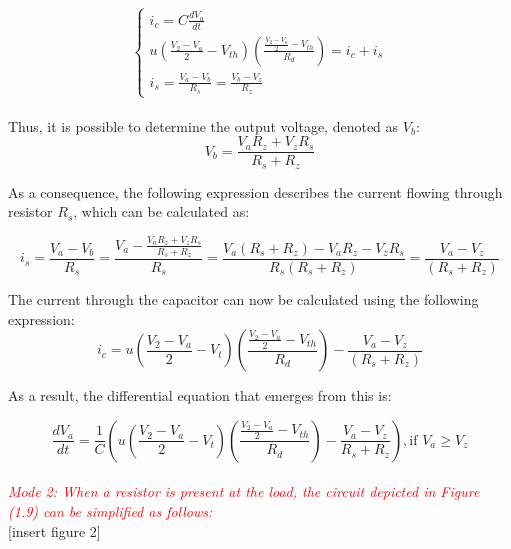 \begin{equation}
    \begin{cases}
        i_c=C\frac{dV_a}{dt}\\
        u(\frac{V_2-V_a}{2}-V_{th})(\frac{\frac{V_2-V_a}{2}-V_{th}}{R_d})=i_c+i_s\\
        i_s=\frac{V_a-V_b}{R_s}=\frac{V_b-V_z}{R_z}
    \end{cases}
\end{equation}\\

Thus, it is possible to determine the output voltage, denoted as $V_b$:\\

\begin{equation}
    V_b=\frac{V_aR_z+V_zR_s}{R_s+R_z}
\end{equation}

As a consequence, the following expression describes the current flowing through resistor $R_s$, which can be calculated as:

\begin{equation}
    i_s=\frac{V_a-V_b}{R_s}=\frac{V_a-\frac{V_aR_z+V_zR_s}{R_s+R_z}}{R_s}=\frac{V_a(R_s+R_z)-V_aR_z-V_zR_s}{R_s(R_s+R_z)}=\frac{V_a-V_z}{(R_s+R_z)}
\end{equation}

The current through the capacitor can now be calculated using the following expression:\\

\begin{equation}
    i_c=u(\frac{V_2-V_a}{2}-V_t)(\frac{\frac{V_2-V_a}{2}-V_{th}}{R_d})-\frac{V_a-V_z}{(R_s+R_z)}
\end{equation}


As a result, the differential equation that emerges from this is:

\begin{equation}
    \frac{dV_a}{dt}=\frac{1}{C}\left(u\left(\frac{V_2-V_a}{2}-V_t\right)\left(\frac{\frac{V_2-V_a}{2}-V_{th}}{R_d}\right)-\frac{V_a-V_z}{R_s+R_z}\right), \text{if } V_a \geq V_z
\end{equation}\\

\large\textcolor{red}{\emph{Mode 2: When a resistor is present at the load, the circuit depicted in Figure (1.9) can be simplified as follows:}}\\

[insert figure 2]\\

